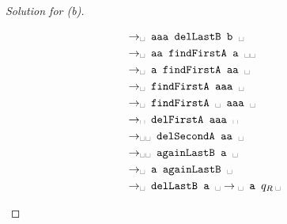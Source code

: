 \documentclass[11pt,a4paper]{article}
\newcommand{\bl}{\ensuremath{\text{\textvisiblespace}}}
\begin{document}
\begin{proof}[Solution for (b)]
\begin{enumerate}
\begin{align*}
\to & \bl \texttt{ aaa delLastB b } \bl \\ 
\to & \bl \texttt{ aa findFirstA a } \bl \bl \\
\to & \bl \texttt{ a findFirstA aa } \bl \\
\to & \bl \texttt{ findFirstA aaa } \bl \\
\to & \bl \texttt{ findFirstA } \bl \texttt{ aaa } \bl \\
\to & \bl \texttt{ delFirstA aaa } \bl \\
\to & \bl \bl \texttt{ delSecondA aa } \bl \\
\to & \bl \bl \texttt{ againLastB a } \bl \\
\to & \bl \texttt{ a againLastB } \bl \\
\to & \bl \texttt{ delLastB a } \bl \to \bl \texttt{ a } q_{R} \, \bl
\end{align*}
 \end{enumerate}
\end{proof}
\end{document}
